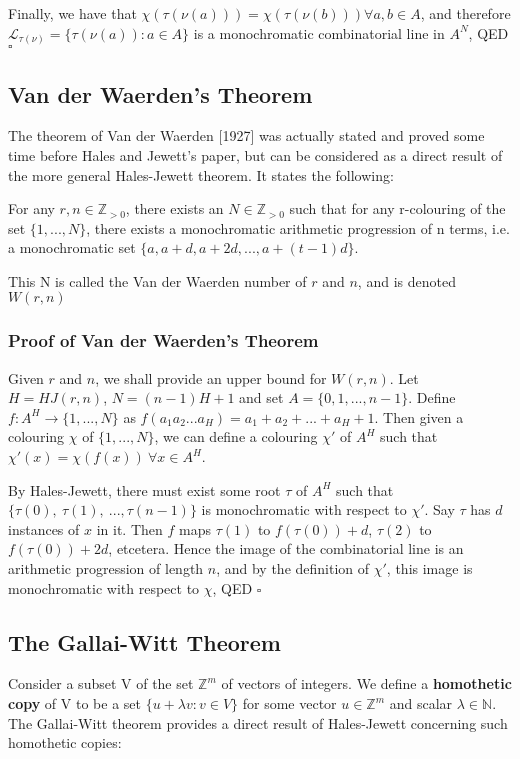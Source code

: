 \documentclass[11pt,a4paper]{article}
\begin{document}
Finally, we have that $\chi(\tau(\nu(a))) = \chi(\tau(\nu(b))) \forall a, b \in A$, and therefore $\mathcal{L}_{\tau(\nu)} = \{\tau(\nu(a)) : a \in A\}$ is a monochromatic combinatorial line in $A^N$, QED $\square$


\subsection{Van der Waerden's Theorem}
The theorem of Van der Waerden [1927] was actually stated and proved some time before Hales and Jewett's paper, but can be considered as a direct result of the more general Hales-Jewett theorem. It states the following:

For any $r, n \in \mathbb{Z}_{>	 0}$, there exists an $N \in \mathbb{Z}_{> 0}$ such that for any r-colouring of the set $\{1, ..., N\}$, there exists a monochromatic arithmetic progression of n terms, i.e. a monochromatic set $\{a, a + d, a + 2d, ..., a + (t - 1)d\}$.

This N is called the Van der Waerden number of $r$ and $n$, and is denoted $W(r, n)$
\subsubsection*{Proof of Van der Waerden's Theorem}
Given $r$ and $n$, we shall provide an upper bound for $W(r, n)$. Let $H = HJ(r, n)$, $N = (n - 1)H + 1$ and set $A = \{0, 1, ..., n-1\}$. Define $f: A^H \rightarrow \{1, ..., N\}$ as $f(a_1 a_2 ... a_H) = a_1 + a_2 + ... + a_H + 1$. Then given a colouring $\chi$ of $\{1, ..., N\}$, we can define a colouring $\chi'$ of $A^H$ such that $\chi'(x) = \chi(f(x)) \ \forall x \in A^H$.

By Hales-Jewett, there must exist some root $\tau$ of $A^H$ such that $\{\tau(0),\
 \tau(1),\ ..., \tau(n-1)\}$ is monochromatic with respect to $\chi'$. Say $\tau$ has $d$ instances of $x$ in it. Then $f$ maps $\tau(1)$ to $f(\tau(0)) + d$, $\tau(2)$ to $f(\tau(0)) + 2d$, etcetera. Hence the image of the combinatorial line is an arithmetic progression of length $n$, and by the definition of $\chi'$, this image is monochromatic with respect to $\chi$, QED $\square$ 
 
 
\subsection{The Gallai-Witt Theorem}
Consider a subset V of the set $\mathbb{Z}^m$ of vectors of integers. We define a \textbf{homothetic copy} of V to be a set $\{u + \lambda v : v \in V\}$ for some vector $u \in \mathbb{Z}^m$ and scalar $\lambda \in \mathbb{N}$. The Gallai-Witt theorem provides a direct result of Hales-Jewett concerning such homothetic copies:
\end{document}
